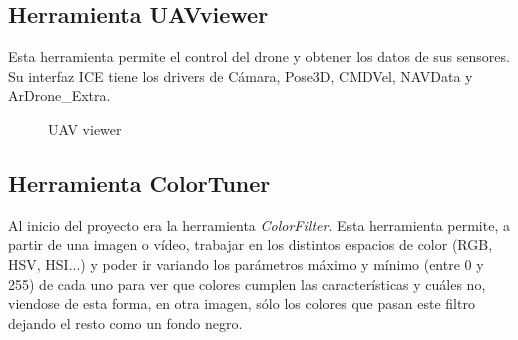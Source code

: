 \subsection{Herramienta UAVviewer}
\label{sec:uavviewer}
\hspace{1 cm} Esta herramienta permite el control del drone y obtener los datos de sus sensores. Su interfaz ICE tiene los drivers de C\'amara, Pose3D, CMDVel, NAVData y ArDrone\_Extra. 

\begin{figure}[H]
 \centering
 \caption{UAV viewer}
 \label{f:UAVViewerTotal}
\end{figure} 


\subsection{Herramienta ColorTuner}
\hspace{1 cm} Al inicio del proyecto era la herramienta \textit{ColorFilter}. Esta herramienta permite, a partir de una imagen o v\'ideo, trabajar en los distintos espacios de color (RGB, HSV, HSI...) y poder ir variando los par\'ametros m\'aximo y m\'inimo (entre 0 y 255) de cada uno para ver que colores cumplen las caracter\'isticas y cu\'ales no, viendose de esta forma, en otra imagen, s\'olo los colores que pasan este filtro dejando el resto como un fondo negro. 

